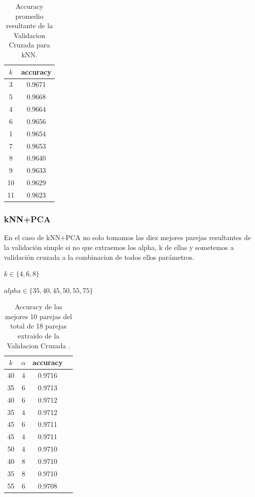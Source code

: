 \begin{table}[h!]
    \begin{center}
        \begin{tabular}{|c|c|}
        \hline
        \textbf{$k$} & \textbf{accuracy} \\
        \hline
        3 &  0.9671\\
        5 & 0.9668\\
        4 & 0.9664\\
        6 & 0.9656\\
        1 &  0.9654\\
        7 & 0.9653\\
        8 & 0.9640\\
        9 & 0.9633\\
        10 & 0.9629\\
        11 & 0.9623\\
        
        \hline
        \end{tabular}
        \caption{Accuracy promedio resultante de la Validacion Cruzada para kNN.}
        \label{knn_crossVal_table}
    \end{center}
\end{table}

\subsubsection{kNN+PCA}

En el caso de kNN+PCA  no solo tomamos las diez mejores parejas resultantes de la validación simple si no que extraemos los alpha, k de ellas y sometemos a validación cruzada a la combinacion de todos ellos parámetros.

$ k \in \{4,6,8\}$
\par
$alpha \in \{  35, 40, 45, 50, 55, 75 \}$
\begin{table}[h!]
    \begin{center}
        \begin{tabular}{|c|c|c|c|}
        \hline
        \textbf{$k$} & \textbf{$\alpha$} & \textbf{accuracy} \\
        \hline
        40 & 4 & 0.9716\\
        35 & 6 & 0.9713\\
        40 & 6 & 0.9712\\
        35 & 4 & 0.9712\\
        45 & 6 & 0.9711\\
        45 & 4 & 0.9711\\
        50 & 4 & 0.9710\\
        40 & 8 & 0.9710\\
        35 & 8 & 0.9710\\
        55 & 6 & 0.9708\\
        
        \hline
        \end{tabular}
        \caption{Accuracy de las mejores 10 parejas del total de 18 parejas extraido de la Validacion Cruzada .}
        \label{knnpca_crossVal_table}

    \end{center}
\end{table}

